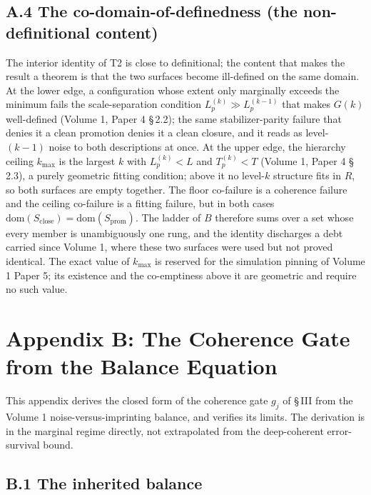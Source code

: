 \documentclass[11pt,oneside]{report}
\theoremstyle{definition}
\theoremstyle{remark}
\begin{document}
\subsection*{A.4 The co-domain-of-definedness (the non-definitional content)}

The interior identity of T2 is close to definitional; the content that makes
the result a theorem is that the two surfaces become ill-defined on the same
domain. At the lower edge, a configuration whose extent only marginally exceeds
the minimum fails the scale-separation condition \ensuremath{L_p^{(k)} \gg L_p^{(k-1)}}
that makes \ensuremath{G(k)} well-defined (Volume 1, Paper 4 \S\,2.2); the same
stabilizer-parity failure that denies it a clean promotion denies it a clean
closure, and it reads as level-\ensuremath{(k-1)} noise to both descriptions at
once. At the upper edge, the hierarchy ceiling \ensuremath{k_{\max}} is the
largest \ensuremath{k} with \ensuremath{L_p^{(k)} < L} and \ensuremath{T_p^{(k)} < T}
(Volume 1, Paper 4 \S\,2.3), a purely geometric fitting condition; above it no
level-\ensuremath{k} structure fits in \ensuremath{R}, so both surfaces are empty
together. The floor co-failure is a coherence failure and the ceiling
co-failure is a fitting failure, but in both cases
\ensuremath{\mathrm{dom}(S_{\mathrm{close}}) = \mathrm{dom}(S_{\mathrm{prom}})}.
The ladder of \ensuremath{B} therefore sums over a set whose every member is
unambiguously one rung, and the identity discharges a debt carried since
Volume 1, where these two surfaces were used but not proved identical. The
exact value of \ensuremath{k_{\max}} is reserved for the simulation pinning of
Volume 1 Paper 5; its existence and the co-emptiness above it are geometric and
require no such value.

\section*{Appendix B: The Coherence Gate from the Balance Equation}

This appendix derives the closed form of the coherence gate \ensuremath{g_j}
of \S\,III from the Volume 1 noise-versus-imprinting balance, and verifies its
limits. The derivation is in the marginal regime directly, not extrapolated
from the deep-coherent error-survival bound.

\subsection*{B.1 The inherited balance}
\end{document}
